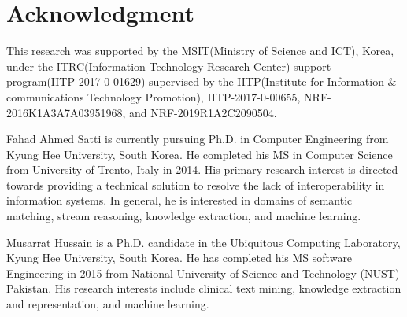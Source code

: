\documentclass{ieeeaccess}
\begin{document}
\section*{Acknowledgment}
This research was supported by the MSIT(Ministry of Science and ICT), Korea, under the ITRC(Information Technology Research Center) support program(IITP-2017-0-01629) supervised by the IITP(Institute for Information \& communications Technology Promotion), IITP-2017-0-00655, NRF-2016K1A3A7A03951968, and NRF-2019R1A2C2090504.




\begin{IEEEbiography}{Fahad Ahmed Satti} is currently pursuing Ph.D. in Computer Engineering from Kyung Hee University, South Korea. He completed his MS in Computer Science from University of Trento, Italy in 2014. His primary research interest is directed towards providing a technical solution to resolve the lack of interoperability in information systems. In general, he is interested in domains of semantic matching, stream reasoning, knowledge extraction, and machine learning.
\end{IEEEbiography}
\begin{IEEEbiography}{Musarrat Hussain} is a Ph.D. candidate in the Ubiquitous Computing Laboratory, Kyung Hee University, 	South Korea. He has completed his MS software Engineering in 2015 from National University of Science 	and Technology (NUST) Pakistan. His research interests include clinical text mining, knowledge 	extraction and representation, and machine learning.
\end{IEEEbiography}
\end{document}
